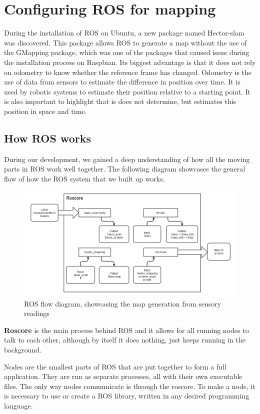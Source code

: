 \clearpage
\section{Configuring ROS for mapping}

During the installation of ROS on Ubuntu, a new package named Hector-slam was discovered. This package allows ROS to generate a map without the use of the GMapping package, which was one of the packages that caused issue during the installation process on Raspbian. Its biggest advantage is that it does not rely on odometry to know whether the reference frame has changed. Odometry is the use of data from sensors to estimate the difference in position over time. It is used by robotic systems to estimate their position relative to a starting point. It is also important to highlight that is does not determine, but estimates this position in space and time.

\subsection{How ROS works}
During our development, we gained a deep understanding of how all the moving parts in ROS work well together. The following diagram showcases the general flow of how the ROS system that we built up works.

\begin{figure}[H]
	\centering
	\includegraphics[width=1\linewidth]{images/ROSflow.png}
	\caption{ROS flow diagram, showcasing the map generation from sensory readings}
\end{figure}

\textbf{Roscore} is the main process behind ROS and it allows for all running nodes to talk to each other, although by itself it does nothing, just keeps running in the background.

Nodes are the smallest parts of ROS that are put together to form a full application. They are run as separate processes, all with their own executable files. The only way nodes communicate is through the roscore. To make a node, it is necessary to use or create a ROS library, written in any desired programming language.

